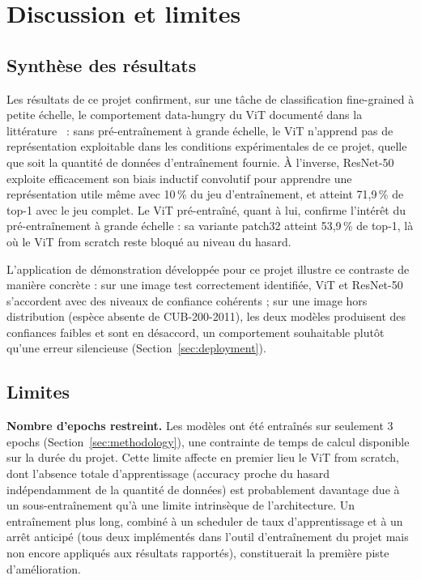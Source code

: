 \section{Discussion et limites}
\label{sec:discussion}

\subsection{Synthèse des résultats}

Les résultats de ce projet confirment, sur une tâche de classification
fine-grained à petite échelle, le comportement data-hungry du ViT
documenté dans la littérature~\cite{dosovitskiy2020vit,touvron2021deit} :
sans pré-entraînement à grande échelle, le ViT n'apprend pas de
représentation exploitable dans les conditions expérimentales de ce
projet, quelle que soit la quantité de données d'entraînement fournie.
À l'inverse, ResNet-50 exploite efficacement son biais inductif
convolutif pour apprendre une représentation utile même avec 10\,\% du
jeu d'entraînement, et atteint 71{,}9\,\% de top-1 avec le jeu complet.
Le ViT pré-entraîné, quant à lui, confirme l'intérêt du pré-entraînement
à grande échelle : sa variante patch32 atteint 53{,}9\,\% de top-1,
là où le ViT from scratch reste bloqué au niveau du hasard.

L'application de démonstration développée pour ce projet illustre ce
contraste de manière concrète : sur une image test correctement
identifiée, ViT et ResNet-50 s'accordent avec des niveaux de confiance
cohérents ; sur une image hors distribution (espèce absente de
CUB-200-2011), les deux modèles produisent des confiances faibles et
sont en désaccord, un comportement souhaitable plutôt qu'une erreur
silencieuse (Section~\ref{sec:deployment}).

\subsection{Limites}

\textbf{Nombre d'epochs restreint.} Les modèles ont été entraînés sur
seulement 3 epochs (Section~\ref{sec:methodology}), une contrainte de
temps de calcul disponible sur la durée du projet. Cette limite affecte
en premier lieu le ViT from scratch, dont l'absence totale
d'apprentissage (accuracy proche du hasard indépendamment de la
quantité de données) est probablement davantage due à un
sous-entraînement qu'à une limite intrinsèque de l'architecture. Un
entraînement plus long, combiné à un scheduler de taux d'apprentissage
et à un arrêt anticipé (tous deux implémentés dans l'outil
d'entraînement du projet mais non encore appliqués aux résultats
rapportés), constituerait la première piste d'amélioration.


